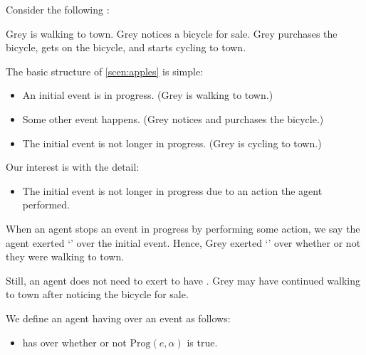 \begin{note}
  Consider the following :

  \begin{scenario}[Apples]%
    \label{scen:apples}%
    Grey is walking to town.
    Grey notices a bicycle for sale.
    Grey purchases the bicycle, gets on the bicycle, and starts cycling to town.
  \end{scenario}

  \noindent%
  The basic structure of \autoref{scen:apples} is simple:
  \begin{itemize}[noitemsep]
  \item
    An initial event is in progress. \hfill (Grey is walking to town.)
  \item
    Some other event happens. \hfill (Grey notices and purchases the bicycle.)
  \item
    The initial event is not longer in progress. \hfill (Grey is cycling to town.)
  \end{itemize}

  \noindent%
  Our interest is with the detail:

  \begin{itemize}
  \item
    The initial event is not longer in progress due to an action the agent performed.
  \end{itemize}

  \noindent%
  When an agent stops an event in progress by performing some action, we say the agent exerted `\ninf{}' over the initial event.
  Hence, Grey exerted `\ninf{}' over whether or not they were walking to town.

  Still, an agent does not need to exert \ninf{} to have \ninf{}.
  Grey may have continued walking to town after noticing the bicycle for sale.

  We define an agent having \ninf{} over an event as follows:

  \begin{definition}[\ninf{2}]
    \label{def:ninf}

    \begin{itemize}
    \item
      \vAgent{} has \ninf{} over whether or not \(\text{Prog}(e, \alpha)\) is true.
    \end{itemize}


\end{definition}
\end{note}

